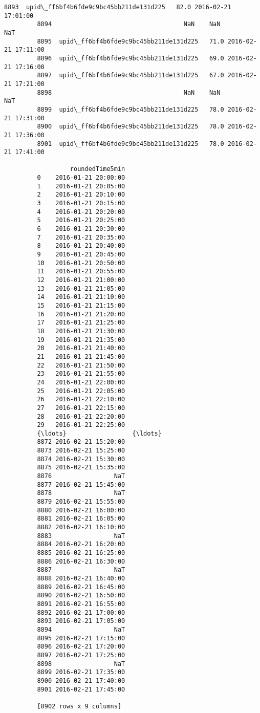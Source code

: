 \documentclass[11pt]{article}
\begin{document}
\begin{Verbatim}[commandchars=\\\{\}]
         8893  upid\_ff6bf4b6fde9c9bc45bb211de131d225   82.0 2016-02-21 17:01:00   
         8894                                    NaN    NaN                 NaT   
         8895  upid\_ff6bf4b6fde9c9bc45bb211de131d225   71.0 2016-02-21 17:11:00   
         8896  upid\_ff6bf4b6fde9c9bc45bb211de131d225   69.0 2016-02-21 17:16:00   
         8897  upid\_ff6bf4b6fde9c9bc45bb211de131d225   67.0 2016-02-21 17:21:00   
         8898                                    NaN    NaN                 NaT   
         8899  upid\_ff6bf4b6fde9c9bc45bb211de131d225   78.0 2016-02-21 17:31:00   
         8900  upid\_ff6bf4b6fde9c9bc45bb211de131d225   78.0 2016-02-21 17:36:00   
         8901  upid\_ff6bf4b6fde9c9bc45bb211de131d225   78.0 2016-02-21 17:41:00   
         
                  roundedTime5min  
         0    2016-01-21 20:00:00  
         1    2016-01-21 20:05:00  
         2    2016-01-21 20:10:00  
         3    2016-01-21 20:15:00  
         4    2016-01-21 20:20:00  
         5    2016-01-21 20:25:00  
         6    2016-01-21 20:30:00  
         7    2016-01-21 20:35:00  
         8    2016-01-21 20:40:00  
         9    2016-01-21 20:45:00  
         10   2016-01-21 20:50:00  
         11   2016-01-21 20:55:00  
         12   2016-01-21 21:00:00  
         13   2016-01-21 21:05:00  
         14   2016-01-21 21:10:00  
         15   2016-01-21 21:15:00  
         16   2016-01-21 21:20:00  
         17   2016-01-21 21:25:00  
         18   2016-01-21 21:30:00  
         19   2016-01-21 21:35:00  
         20   2016-01-21 21:40:00  
         21   2016-01-21 21:45:00  
         22   2016-01-21 21:50:00  
         23   2016-01-21 21:55:00  
         24   2016-01-21 22:00:00  
         25   2016-01-21 22:05:00  
         26   2016-01-21 22:10:00  
         27   2016-01-21 22:15:00  
         28   2016-01-21 22:20:00  
         29   2016-01-21 22:25:00  
         {\ldots}                  {\ldots}  
         8872 2016-02-21 15:20:00  
         8873 2016-02-21 15:25:00  
         8874 2016-02-21 15:30:00  
         8875 2016-02-21 15:35:00  
         8876                 NaT  
         8877 2016-02-21 15:45:00  
         8878                 NaT  
         8879 2016-02-21 15:55:00  
         8880 2016-02-21 16:00:00  
         8881 2016-02-21 16:05:00  
         8882 2016-02-21 16:10:00  
         8883                 NaT  
         8884 2016-02-21 16:20:00  
         8885 2016-02-21 16:25:00  
         8886 2016-02-21 16:30:00  
         8887                 NaT  
         8888 2016-02-21 16:40:00  
         8889 2016-02-21 16:45:00  
         8890 2016-02-21 16:50:00  
         8891 2016-02-21 16:55:00  
         8892 2016-02-21 17:00:00  
         8893 2016-02-21 17:05:00  
         8894                 NaT  
         8895 2016-02-21 17:15:00  
         8896 2016-02-21 17:20:00  
         8897 2016-02-21 17:25:00  
         8898                 NaT  
         8899 2016-02-21 17:35:00  
         8900 2016-02-21 17:40:00  
         8901 2016-02-21 17:45:00  
         
         [8902 rows x 9 columns]
\end{Verbatim}
            
\end{document}
